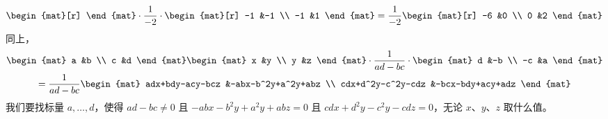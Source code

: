 \begin{answer}
\begin{exparts}
\begin{equation*}
\begin{mat}[r]
          \end{mat}
          \cdot\frac{1}{-2}\cdot
          \begin{mat}[r]
            -1  &-1  \\
            -1  &1
          \end{mat}
          =
          \frac{1}{-2}
          \begin{mat}[r]
            -6  &0   \\
             0  &2
          \end{mat}
        \end{equation*}
      \partsitem 同上，
        \begin{multline*}
           \begin{mat}
              a  &b  \\
              c  &d
           \end{mat}
           \begin{mat}
              x  &y  \\
              y  &z
           \end{mat}
           \cdot\frac{1}{ad-bc}\cdot
           \begin{mat}
              d  &-b \\
             -c  &a
           \end{mat}                               \\
           =\frac{1}{ad-bc}
           \begin{mat}
              adx+bdy-acy-bcz    &-abx-b^2y+a^2y+abz \\
              cdx+d^2y-c^2y-cdz  &-bcx-bdy+acy+adz
           \end{mat}
        \end{multline*}
        我们要找标量 \( a,\ldots,d \)，使得
        \( ad-bc\neq 0 \) 且
        \( -abx-b^2y+a^2y+abz=0 \)
        且 \( cdx+d^2y-c^2y-cdz=0 \)，无论
        \( x \)、\( y \)、\( z \)
        取什么值。


\end{exparts}
\end{answer}
